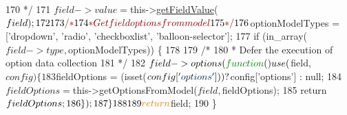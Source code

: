 \begin{DoxyCode}
170 \textcolor{comment}{         */}
171         $field->value = $this->\hyperlink{classDMA_1_1Friends_1_1Classes_1_1ActivityForm_ab7d19395c670391b052793e77fd364f2}{getFieldValue}($field);
172 
173         \textcolor{comment}{/*}
174 \textcolor{comment}{         * Get field options from model}
175 \textcolor{comment}{         */}
176         $optionModelTypes = [\textcolor{stringliteral}{'dropdown'}, \textcolor{stringliteral}{'radio'}, \textcolor{stringliteral}{'checkboxlist'}, \textcolor{stringliteral}{'balloon-selector'}];
177         \textcolor{keywordflow}{if} (in\_array($field->type, $optionModelTypes)) \{
178 
179             \textcolor{comment}{/*}
180 \textcolor{comment}{             * Defer the execution of option data collection}
181 \textcolor{comment}{             */}
182             $field->options(\textcolor{keyword}{function} () use ($field, $config) \{
183                 $fieldOptions = (isset($config[\textcolor{stringliteral}{'options'}])) ? $config[\textcolor{stringliteral}{'options'}] : null;
184                 $fieldOptions = $this->getOptionsFromModel($field, $fieldOptions);
185                 \textcolor{keywordflow}{return} $fieldOptions;
186             \});
187         \}
188 
189         \textcolor{keywordflow}{return} $field;
190     \}
\end{DoxyCode}
\hypertarget{classDMA_1_1Friends_1_1Classes_1_1ActivityForm_a63f9588fb768954aa6e792841ef7a798}{}
